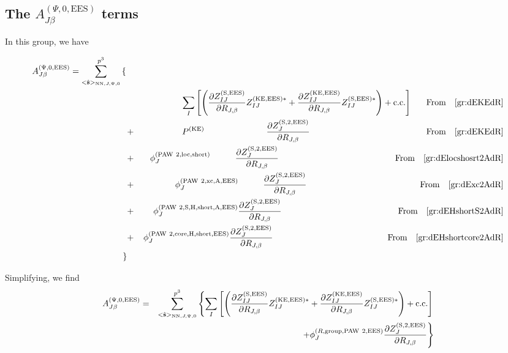 \documentclass[paper=a4, fontsize=11pt]{article} %
\numberwithin{equation}{section} %
\numberwithin{figure}{section} %
\numberwithin{table}{section} %
\newcommand{\p}{\partial}
\newcommand{\hs}{{\hat{\bf{s}}}}
\newcommand{\rS}{{\mathrm{S}}}
\newcommand{\rKE}{{\mathrm{KE}}}
\newcommand{\rEES}{{\mathrm{EES}}}
\newcommand{\rxc}{{\mathrm{xc}}}
\newcommand{\rgr}{{\mathrm{group}}}
\newcommand{\rcore}{{\mathrm{core}}}
\newcommand{\rNN}{{\mathrm{NN}}}
\newcommand{\rshort}{{\mathrm{short}}}
\newcommand{\rcc}{{\mathrm{c.c.}}}
\newcommand{\rP}{{\mathrm{PAW}}}
\newcommand{\rH}{{\mathrm{H}}}
\newcommand{\rA}{{\mathrm{A}}}
\newcommand{\rlo}{{\mathrm{loc}}}
\newcommand{\RJb}{{R_{J,\beta}}}
\newcommand{\hsJpzr}{{<\hs>_{\rNN,J,\Psi,0}}}
\newcommand{\fr}{{\nonumber \ \ \ \ \ \mathrm{From}\ \ \ }}
\begin{document}
\subsection{The $A_{J\beta}^{(\Psi,0,\rEES)}$ terms}

In this group, we have

\begin{eqnarray}
A_{J\beta}^{(\Psi,0,\rEES)} = 
 \sum_{\hsJpzr}^{p^3} \left\{ \right. &&  \nonumber \\
&& \left. \sum_I \left[\left(\frac{\p Z_{IJ}^{(\rS,\rEES)}}{\p \RJb} Z_{IJ}^{(\rKE,\rEES)*} +\frac{\p Z_{IJ}^{(\rKE,\rEES)}}{\p \RJb}Z_{IJ}^{(\rS,\rEES)*}\right) + \rcc \right] \fr \eqref{gr:dEKEdR} \right. \\
&+& \left. P^{(\rKE)}\hspace*{1in} \frac{\p Z_{J}^{(\rS,2,\rEES)}}{\p \RJb} \hspace*{1.65in}\fr \eqref{gr:dEKEdR} \right. \\
&+& \left. \phi_J^{(\rP\ 2,\rlo,\rshort)}\hspace*{0.4in} \frac{\p Z_{J}^{(\rS,2,\rEES)}}{\p \RJb} \hspace*{1.65in} \fr \eqref{gr:dElocshosrt2AdR} \right. \\
&+& \left. \phi_J^{(\rP\ 2,\rxc,\rA,\rEES)}\hspace*{0.4in}\frac{\p Z_{J}^{(\rS,2,\rEES)}}{\p \RJb} \hspace*{1.6in}\fr \eqref{gr:dExc2AdR} \right. \\
&+& \left. \phi_J^{(\rP\ 2,\rS,\rH,\rshort,\rA,\rEES)}\frac{\p Z_{J}^{(\rS,2,\rEES)}}{\p \RJb} \hspace*{1.65in}\fr \eqref{gr:dEHshortS2AdR} \right. \\
&+& \left. \phi_J^{(\rP\ 2,\rcore,\rH,\rshort,\rEES)}\frac{\p Z_{J}^{(\rS,2,\rEES)}}{\p \RJb} \hspace*{1.62in}\fr \eqref{gr:dEHshortcore2AdR} \right. \\
\left. \right\} &&
\end{eqnarray}

Simplifying, we find
\begin{eqnarray}\label{gr:AJb1}
A_{J\beta}^{(\Psi,0,\rEES)} &=& \sum_{\hsJpzr}^{p^3} \left\{ \sum_I \left[\left(\frac{\p Z_{IJ}^{(\rS,\rEES)}}{\p \RJb} Z_{IJ}^{(\rKE,\rEES)*} +\frac{\p Z_{IJ}^{(\rKE,\rEES)}}{\p \RJb}Z_{IJ}^{(\rS,\rEES)*}\right) + \rcc \right] \right. \nonumber \\
&& \left. \hspace*{1in} +\phi_J^{(R,\rgr,\rP\ 2,\rEES)}\frac{\p Z_{J}^{(\rS,2,\rEES)}}{\p \RJb} \right\} 
\end{eqnarray}
\end{document}

